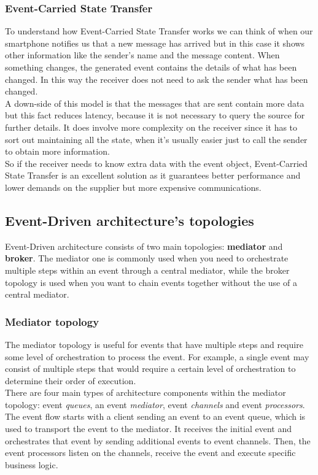 \documentclass[11pt]{article} %
\begin{document}
\subsubsection{Event-Carried State Transfer}
To understand how Event-Carried State Transfer works we can think of when our smartphone notifies us that a new message has arrived but in this case it shows other information like the sender's name and the message content. When something changes, the generated event contains the details of what has been changed. In this way the receiver does not need to ask the sender what has been changed.\\
A down-side of this model is that the messages that are sent contain more data but this fact reduces latency, because it is not necessary to query the source for further details. It does involve more complexity on the receiver since it has to sort out maintaining all the state, when it's usually easier just to call the sender to obtain more information.\\
So if the receiver needs to know extra data with the event object, Event-Carried State Transfer is an excellent solution as it guarantees better performance and lower demands on the supplier but more expensive communications.


\subsection{Event-Driven architecture's topologies}
Event-Driven architecture consists of two main topologies: \textbf{mediator} and \textbf{broker}. The mediator one is commonly used when you need to orchestrate multiple steps within an event through a central mediator, while the broker topology is used when you want to chain events together without the use of a central mediator.

\subsubsection{Mediator topology}
The mediator topology is useful for events that have multiple steps and require some level of orchestration to process the event. For example, a single event may consist of multiple steps that would require a certain level of orchestration to determine their order of execution. \\
There are four main types of architecture components within the mediator topology: event \emph{queues}, an event \emph{mediator}, event \emph{channels} and event \emph{processors}. \\
The event flow starts with a client sending an event to an event queue, which is used to transport the event to the mediator. It receives the initial event and orchestrates that event by sending additional events to event channels. Then, the event processors listen on the channels, receive the event and execute specific business logic.
\end{document}
